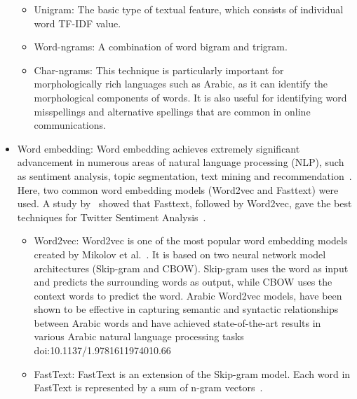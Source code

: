 \documentclass[11pt]{article}
\begin{document}
\begin{itemize}
\begin{itemize}
\item Unigram: The basic type of textual feature, which consists of individual word TF-IDF value.
\item Word-ngrams: A combination of word bigram and trigram.
\item Char-ngrams: 
This technique is particularly important for morphologically rich languages such as Arabic, as it can identify the morphological components of words. It is also useful for identifying word misspellings and alternative spellings that are common in online communications.\cite{alsafari2020hate}
\end{itemize}
\item Word embedding:
Word embedding achieves extremely significant advancement in numerous areas of natural language processing (NLP), such as sentiment analysis, topic segmentation, text mining and recommendation~\cite{xu2018incorporating,Li_Shah_Liu_Nourbakhsh_2017, naili2017comparative}. Here, two common word embedding models (Word2vec and Fasttext) were used. A study by~\citet{kaibi2019comparative} showed that Fasttext, followed by Word2vec, gave the best techniques for Twitter Sentiment Analysis~\cite{kaibi2019comparative}. 

\begin{itemize}
    \item Word2vec:
Word2vec is one of the most popular word embedding models created by Mikolov et al.~\cite{mikolov2013efficient}. It is based on two neural network model architectures (Skip-gram and CBOW). Skip-gram uses the word as input and predicts the surrounding words as output, while CBOW uses the context words to predict the word. Arabic Word2vec models, have been shown to be effective in capturing semantic and syntactic relationships between Arabic words and have achieved state-of-the-art results in various Arabic natural language processing tasks~\cite{}
doi:10.1137/1.9781611974010.66

 \item FastText:
FastText is an extension of the Skip-gram model.%
Each word in FastText is represented by a sum of n-gram vectors~\cite{athiwaratkun2018probabilistic}.  
\end{itemize}

\end{itemize}
\end{document}
